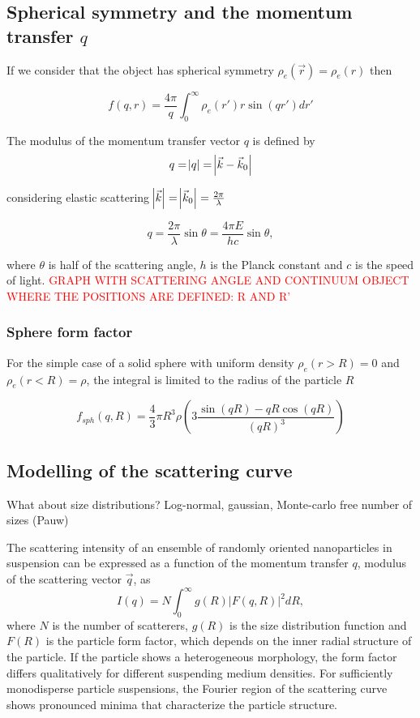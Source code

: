 \subsection{Spherical symmetry and the momentum transfer $q$}

If we consider that the object has spherical symmetry $\rho_e(\vec{r})=\rho_e(r)$ then

\begin{equation}
       f(q,r)=\frac{4\pi}{q} \int_0^{\infty} \rho_e(r') r \sin(qr')  dr'
\end{equation}

The modulus of the momentum transfer vector $q$ is defined by
\begin{equation}
       q=\abs{q}=\abs{\vec{k} - \vec{k}_0}
\end{equation}

considering elastic scattering $\abs{\vec{k}}=\abs{\vec{k}_0}=\frac{2\pi}{\lambda}$

\begin{equation}
q=\frac{2\pi }{\lambda}\sin\theta=\frac{4\pi E}{h c}\sin\theta ,
\end{equation}

where \(\theta\) is half of the scattering angle, \(h\) is the Planck constant and \(c\) is the speed of light. \textcolor{red}{GRAPH WITH SCATTERING ANGLE AND CONTINUUM OBJECT WHERE THE POSITIONS ARE DEFINED: R AND R'}
\subsubsection{Sphere form factor}
For the simple case of a solid sphere with uniform density $\rho_e(r>R)=0$ and $\rho_e(r<R)=\rho$, the integral is limited to the radius of the particle $R$

\begin{equation}
       f_{sph}(q,R)=\frac{4}{3}\pi R^3 \rho \left( 3\frac{\sin(qR)-qR\cos(qR)}{\left( qR \right)^3} \right)
\end{equation}

\subsection{Modelling of the scattering curve}
What about size distributions? Log-normal, gaussian, Monte-carlo free number of sizes (Pauw)

The scattering intensity of an ensemble of randomly oriented nanoparticles in suspension can be expressed as a function of the momentum transfer \( q \), modulus of the scattering vector \(\vec q\), as
\begin{equation}
\label{eq:intensity}
I(q)=N\int_{0}^{\infty} g(R)\left|F(q,R) \right|^2 dR,
\end{equation}
where \(N\) is the number of scatterers, \(g(R)\) is the size distribution function and \(F(R)\) is the particle form factor, which depends on the inner radial structure of the particle. If the particle shows a heterogeneous morphology, the form factor differs qualitatively for different suspending medium densities.  For sufficiently monodisperse particle suspensions, the Fourier region of the scattering curve shows pronounced minima that characterize the particle structure. 

